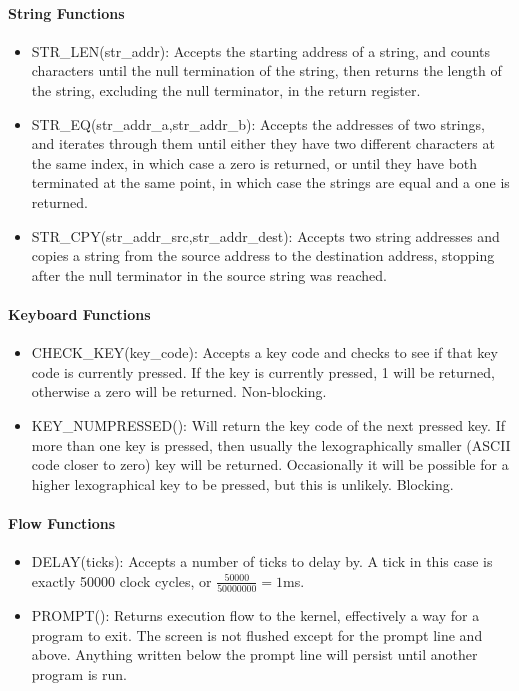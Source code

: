 \documentclass[../ProjectDocumentation.tex]{subfiles}
\begin{document}
\paragraph{String Functions}
\begin{itemize}
\item STR\_LEN(str\_addr):
	Accepts the starting address of a string, and counts characters until the null termination of the string, then returns the length of the string, excluding the null terminator, in the return register.
\item STR\_EQ(str\_addr\_a,str\_addr\_b):
	Accepts the addresses of two strings, and iterates through them until either they have two different characters at the same index, in which case a zero is returned, or until they have both terminated at the same point, in which case the strings are equal and a one is returned.
\item STR\_CPY(str\_addr\_src,str\_addr\_dest):
	Accepts two string addresses and copies a string from the source address to the destination address, stopping after the null terminator in the source string was reached.
\end{itemize}
\paragraph{Keyboard Functions}
\begin{itemize}
\item CHECK\_KEY(key\_code):
	Accepts a key code and checks to see if that key code is currently pressed. If the key is currently pressed, 1 will be returned, otherwise a zero will be returned. Non-blocking.
\item KEY\_NUMPRESSED():
	Will return the key code of the next pressed key. If more than one key is pressed, then usually the lexographically smaller (ASCII code closer to zero) key will be returned. Occasionally it will be possible for a higher lexographical key to be pressed, but this is unlikely. Blocking.
\end{itemize}
\paragraph{Flow Functions}
\begin{itemize}
\item DELAY(ticks):
	Accepts a number of ticks to delay by. A tick in this case is exactly 50000 clock cycles, or $\frac{50000}{50000000}=1$ms.
\item PROMPT():
	Returns execution flow to the kernel, effectively a way for a program to exit. The screen is not flushed except for the prompt line and above. Anything written below the prompt line will persist until another program is run.
\end{itemize}
\end{document}
